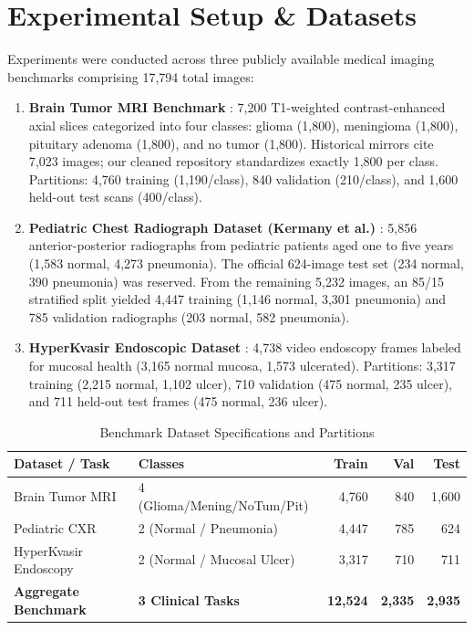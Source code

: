 \documentclass[conference]{IEEEtran}
\begin{document}
\section{Experimental Setup \& Datasets}
Experiments were conducted across three publicly available medical imaging benchmarks comprising 17,794 total images:
\begin{enumerate}
    \item \textbf{Brain Tumor MRI Benchmark} \cite{afshar2019capsule, cheng2014retrieval}: 7,200 T1-weighted contrast-enhanced axial slices categorized into four classes: glioma (1,800), meningioma (1,800), pituitary adenoma (1,800), and no tumor (1,800). Historical mirrors cite 7,023 images; our cleaned repository standardizes exactly 1,800 per class. Partitions: 4,760 training (1,190/class), 840 validation (210/class), and 1,600 held-out test scans (400/class).
    \item \textbf{Pediatric Chest Radiograph Dataset (Kermany et al.)} \cite{kermany2018identifying}: 5,856 anterior-posterior radiographs from pediatric patients aged one to five years (1,583 normal, 4,273 pneumonia). The official 624-image test set (234 normal, 390 pneumonia) was reserved. From the remaining 5,232 images, an 85/15 stratified split yielded 4,447 training (1,146 normal, 3,301 pneumonia) and 785 validation radiographs (203 normal, 582 pneumonia).
    \item \textbf{HyperKvasir Endoscopic Dataset} \cite{borgli2020hyperkvasir}: 4,738 video endoscopy frames labeled for mucosal health (3,165 normal mucosa, 1,573 ulcerated). Partitions: 3,317 training (2,215 normal, 1,102 ulcer), 710 validation (475 normal, 235 ulcer), and 711 held-out test frames (475 normal, 236 ulcer).
\end{enumerate}

\begin{table}[t]
\caption{Benchmark Dataset Specifications and Partitions}
\label{tab:datasets}
\centering
\begin{tabular}{llrrr}
\toprule
\textbf{Dataset / Task} & \textbf{Classes} & \textbf{Train} & \textbf{Val} & \textbf{Test} \\
\midrule
Brain Tumor MRI \cite{afshar2019capsule} & 4 (Glioma/Mening/NoTum/Pit) & 4,760 & 840 & 1,600 \\
Pediatric CXR \cite{kermany2018identifying} & 2 (Normal / Pneumonia) & 4,447 & 785 & 624 \\
HyperKvasir Endoscopy \cite{borgli2020hyperkvasir} & 2 (Normal / Mucosal Ulcer) & 3,317 & 710 & 711 \\
\midrule
\textbf{Aggregate Benchmark} & \textbf{3 Clinical Tasks} & \textbf{12,524} & \textbf{2,335} & \textbf{2,935} \\
\bottomrule
\end{tabular}
\end{table}
\end{document}
